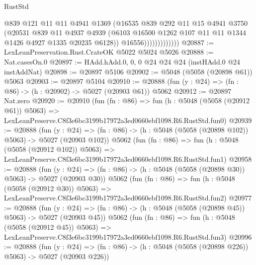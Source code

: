 \begin{lexlean}{RustStd}
\begin{coremodule}
                            @839
                            @121
                            @11
                            @11
                            @4941
                            @1369
                            (@16535
                              @839
                              @292
                              @11
                              @15
                              @4941
                              @3750
                              (@20531
                                @839
                                @11
                                @4937
                                @4939
                                (@6103
                                  @16500
                                  @1262
                                  @107
                                  @11
                                  @11
                                  @1344
                                  @1426
                                  @4927
                                  @1335
                                  @20235
                                  @6128))
                              @16556)))))))))))))
@20887 := LexLeanPreservation.Rust.CrateOK @5022 @5024 @5026
@20888 := Nat.casesOn.{0}
@20897 := HAdd.hAdd.{0, 0, 0} @24 @24 @24 (instHAdd.{0} @24 instAddNat)
@20898 := @20897 @5106
@20902 := @5048 (@5058 (@20898 @61)) @5063
@20903 := @20897 @5104
@20910 := @20888 (fun (y : @24) => (fn : @86) -> (h : @20902) -> @5027 (@20903 @61)) @5062
@20912 := @20897 Nat.zero
@20920 := @20910
    (fun (fn : @86) =>
    fun (h : @5048 (@5058 (@20912 @61)) @5063) =>
    LexLeanPreserve.C8f3e6bc3199b17972a3ed0660ebf1098.R6.RustStd.fun0)
@20939 := @20888
    (fun (y : @24) => (fn : @86) -> (h : @5048 (@5058 (@20898 @102)) @5063) -> @5027 (@20903 @102))
    @5062
    (fun (fn : @86) =>
    fun (h : @5048 (@5058 (@20912 @102)) @5063) =>
    LexLeanPreserve.C8f3e6bc3199b17972a3ed0660ebf1098.R6.RustStd.fun1)
@20958 := @20888
    (fun (y : @24) => (fn : @86) -> (h : @5048 (@5058 (@20898 @30)) @5063) -> @5027 (@20903 @30))
    @5062
    (fun (fn : @86) =>
    fun (h : @5048 (@5058 (@20912 @30)) @5063) =>
    LexLeanPreserve.C8f3e6bc3199b17972a3ed0660ebf1098.R6.RustStd.fun2)
@20977 := @20888
    (fun (y : @24) => (fn : @86) -> (h : @5048 (@5058 (@20898 @45)) @5063) -> @5027 (@20903 @45))
    @5062
    (fun (fn : @86) =>
    fun (h : @5048 (@5058 (@20912 @45)) @5063) =>
    LexLeanPreserve.C8f3e6bc3199b17972a3ed0660ebf1098.R6.RustStd.fun3)
@20996 := @20888
    (fun (y : @24) => (fn : @86) -> (h : @5048 (@5058 (@20898 @226)) @5063) -> @5027 (@20903 @226))

\end{coremodule}
\end{lexlean}
